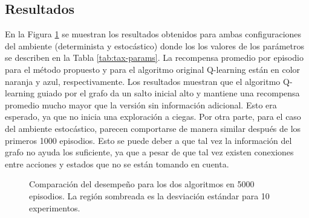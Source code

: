 \subsection{Resultados}

En la Figura \ref{fig:results-taxi} se muestran los resultados obtenidos
para ambas configuraciones del ambiente (determinista y estocástico) donde los
los valores de los parámetros se describen en la Tabla \ref{tab:tax-params}.
La recompensa promedio por episodio para el método propuesto y para el algoritmo
original Q-learning están en color naranja y azul, respectivamente. 
Los resultados muestran que el algoritmo Q-learning guiado por el grafo da un salto inicial alto y mantiene una recompensa promedio mucho mayor que la versión sin información adicional. Esto era esperado, ya que 
no inicia una exploración a ciegas. Por otra parte, para el caso 
del ambiente estocástico, parecen comportarse de manera similar después de los
primeros 1000 episodios. Esto se puede deber a que tal vez la información del 
grafo no ayuda los suficiente, ya que a pesar de que tal vez existen
conexiones entre acciones y estados que no se están tomando en cuenta.


\begin{figure}[H]
  \centering
  \hfill
  \caption{Comparación del desempeño para los dos algoritmos en 5000 episodios. La región sombreada es la desviación estándar para 10 experimentos.}
  \label{fig:results-taxi}
\end{figure}
